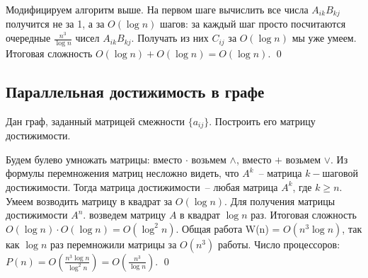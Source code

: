  Модифицируем алгоритм выше. На первом шаге вычислить все числа $A_{ik}B_{kj}$ получится не за 1, а за $O(\log n)$ шагов: за каждый шаг просто посчитаются очередные $\frac{n^3}{\log n}$ чисел $A_{ik}B_{kj}$. Получать из них $C_{ij}$ за $O(\log n)$ мы уже умеем. Итоговая сложность $O(\log n) + O(\log n) = O(\log n)$.  \qed

\subsection{Параллельная достижимость в графе}
\begin{problem*}
	Дан граф, заданный матрицей смежности $\{a_{ij}\}$. Построить его матрицу достижимости.
\end{problem*}

 Будем булево умножать матрицы: вместо $\cdot$ возьмем $\land$, вместо $+$ возьмем $\lor$. Из формулы перемножения матриц несложно видеть, что $A^k$~-- матрица $k-$шаговой достижимости. Тогда матрица достижимости~-- любая матрица $A^k$, где $k\geq n$. Умеем возводить матрицу в квадрат за $O(\log n)$. Для получения матрицы достижимости $A^n$. возведем матрицу $A$ в квадрат $\log n$ раз. Итоговая сложность $O(\log n) \cdot O(\log n) = O(\log^2 n)$. Общая работа W(n) = $O(n^3\log n)$, так как $\log n$ раз перемножили матрицы за $O(n^3)$ работы. Число процессоров: $P(n) = O\left(\frac{n^3\log n}{\log^2 n}\right) = O\left(\frac{n^3}{\log n}\right)$. \qed
